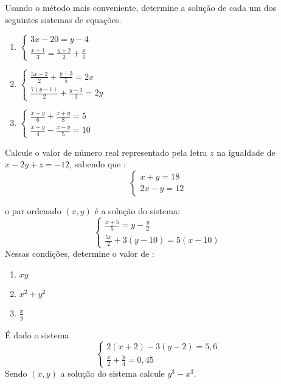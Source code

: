 	\item Usando o método mais conveniente, determine a solução de cada um dos seguintes sistemas de equações.
	\begin{multicols}{3}
	\begin{enumerate}
		\item $\begin{cases}	3x-20=y-4\\ \displaystyle\frac{x+1}{3}=\frac{y+2}{2}+\frac{x}{6} \end{cases}$
		\item $\begin{cases}\displaystyle\frac{5x-2}{2}+\frac{y-3}{5}=2x\\ \displaystyle\frac{7(y-1)}{2}+\frac{y-3}{3}=2y\end{cases}$
		\item $\begin{cases} \displaystyle\frac{x-y}{6}+\frac{x+y}{8}=5\\ \displaystyle\frac{x+y}{4}-\frac{x-y}{5}=10\end{cases}$
	\end{enumerate}
	\end{multicols}
	
	\item Calcule o valor de número real representado pela letra $z$ na igualdade de $x-2y+z=-12$, sabendo que :$$\begin{cases} x+y=18\\ 2x-y=12 \end{cases}$$
				
	\item o par ordenado $(x,y)$ é a solução do sistema:$$\begin{cases} \displaystyle\frac{x+5}{5}=y-\displaystyle\frac{y}{2}\\ \displaystyle\frac{5x}{2}+3(y-10)=5(x-10) \end{cases}$$Nessas condições, determine o valor de :
	\begin{multicols}{3}	
	\begin{enumerate}
	\item $xy$ 
	\item $x^2+y^2$
	\item $\displaystyle\frac{x}{y}$
	\end{enumerate}
	\end{multicols}
	
	\item É dado o sistema $$\begin{cases} \displaystyle{2(x+2)-3(y-2)=5,6}\\ \displaystyle\frac{x}{2}+\frac{y}{4}=0,45 \end{cases}$$ Sendo $(x,y)$ a solução do sistema calcule $y^3-x^3$.
	
